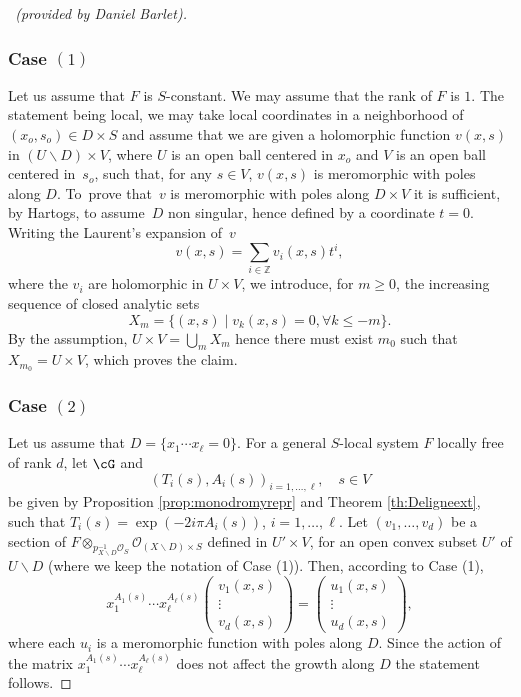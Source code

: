 \documentclass[english]{smfart}
\numberwithin{subsection}{section}
\def\sho{\mathcal{O}}\let\cO\sho
\newcommand{\Z}{\mathbb{Z}}\let\ZZ\Z
\let\setminus\smallsetminus
\let\leq\leqslant
\let\geq\geqslant
\numberwithin{equation}{section}
\theoremstyle{plain}
\theoremstyle{definition}
\begin{document}
\begin{proof}[\proofname\ (provided by Daniel Barlet)]
\item[]
\subsubsection*{Case $(1)$}
Let us assume that $F$ is $S$-constant. We may assume that the rank of $F$ is $1$. The statement being local, we may take local coordinates in a neighborhood of $(x_o,s_o)\in D\times S$ and assume that we are given a holomorphic function $v(x,s)$ in $(U\setminus D)\times V$, where $U$ is an open ball centered in $x_o$ and $V$ is an open ball centered in~$s_o$, such that, for any $s\in V$, $v(x,s)$ is meromorphic with poles along $D$. To~prove that~$v$ is meromorphic with poles along $D\times V$ it is sufficient, by Hartogs, to assume~$D$ non singular, hence defined by a coordinate $t=0$. Writing the Laurent's expansion of~$v$ $$v(x,s)=\sum_{i\in\Z} v_i(x,s)t^i,$$ where the $v_i$ are holomorphic in $U\times V$, we introduce, for $m\geq 0$, the increasing sequence of closed analytic sets
$$X_m=\{(x,s)\mid v_k(x,s)=0, \forall k\leq -m\}.$$
By the assumption, $U\times V=\bigcup_m X_m$ hence there must exist $m_0$ such that $X_{m_0}=U\times V$, which proves the claim.

\subsubsection*{Case $(2)$}
Let us assume that $D=\{x_1\cdots x_\ell=0\}$.
For a general $S$-local system $F$ locally free of rank $d$, let $\cG$ and $$(T_i(s), A_i(s))_{i=1,\dots,\ell},\quad s\in V$$ be given by Proposition \ref{prop:monodromyrepr} and Theorem \ref{th:Deligneext}, such that $T_i(s)=\exp(-2i\pi A_i(s))$, $i=1,\dots, \ell$. Let $(v_1,\dots, v_d)$ be a section of $F\otimes_{p_{X\setminus D}^{-1}\sho_S} \sho_{(X\setminus D)\times S}$ defined in $U'\times V$, for an open convex subset $U'$ of $U\setminus D$ (where we keep the notation of Case (1)). Then, according to Case (1),
\[
x_1^{A_1(s)}\cdots x_\ell^{A_\ell(s)}\begin{pmatrix}v_1(x,s)\\\vdots\\v_d(x,s)\end{pmatrix}
=\begin{pmatrix}u_1(x,s)\\\vdots\\ u_d(x,s)\end{pmatrix},
\]
where each $u_i$ is a meromorphic function with poles along $D$. Since the action of the matrix $x_1^{A_1(s)}\cdots x_\ell^{A_\ell(s)}$ does not affect the growth along $D$ the statement follows.
\end{proof}
\end{document}
